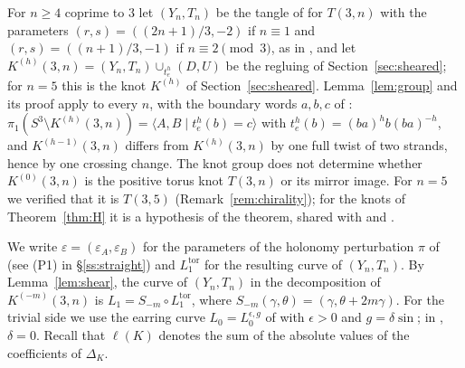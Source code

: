 For $n\ge4$ coprime to $3$ let $(Y_n,T_n)$ be the tangle of \cite[\S10]{HHK2} for $T(3,n)$ with the
parameters $(r,s)=((2n+1)/3,-2)$ if $n\equiv1$ and $(r,s)=((n+1)/3,-1)$ if $n\equiv2\pmod3$, as
in \cite{WuebbenV}, and let $K^{(h)}(3,n)=(Y_n,T_n)\cup_{t_e^h}(D,U)$ be the regluing of
Section~\ref{sec:sheared}; for $n=5$ this is the knot $K^{(h)}$ of Section~\ref{sec:sheared}. Lemma~\ref{lem:group} and its proof apply to every $n$, with the boundary words
$a,b,c$ of \cite[(3.2)]{WuebbenV}: $\pi_1(S^3\setminus K^{(h)}(3,n))=\langle A,B\mid t_e^h(b)=c\rangle$ with
$t_e^h(b)=(ba)^hb(ba)^{-h}$, and $K^{(h-1)}(3,n)$ differs from $K^{(h)}(3,n)$ by one full twist of two strands,
hence by one crossing change. The knot group does not determine whether $K^{(0)}(3,n)$ is the positive torus knot $T(3,n)$ or its
mirror image. For $n=5$ we verified that it is $T(3,5)$ (Remark~\ref{rem:chirality}); for the knots of
Theorem~\ref{thm:H} it is a hypothesis of the theorem, shared with \cite{HHK2} and \cite{WuebbenV}.

We write $\varepsilon=(\varepsilon_A,\varepsilon_B)$ for the parameters of the holonomy perturbation $\pi$
of \cite{WuebbenV} (see (P1) in \S\ref{ss:straight}) and $L_1^{\mathrm{tor}}$ for the resulting curve of $(Y_n,T_n)$. By Lemma~\ref{lem:shear}, the
curve of $(Y_n,T_n)$ in the decomposition of $K^{(-m)}(3,n)$ is $L_1=S_{-m}\circ L_1^{\mathrm{tor}}$, where
$S_{-m}(\gamma,\theta)=(\gamma,\theta+2m\gamma)$. For the trivial side we use the earring curve
$L_0=L_0^{\epsilon,g}$ of \cite[Def.~3.4]{HHK2} with $\epsilon>0$ and $g=\delta\sin$; in \cite{WuebbenV},
$\delta=0$. Recall that $\ell(K)$ denotes the sum of the absolute values of the coefficients of $\Delta_K$.

